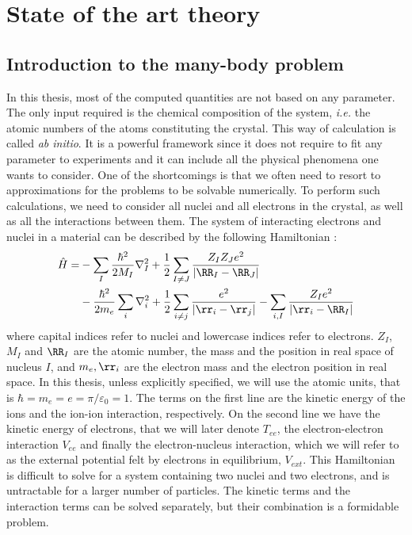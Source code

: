 \chapter{ State of the art theory} \label{chap:theory}

\chaptertoc{}
%

%
\section{Introduction to the many-body problem} \label{sec:BO_approx}
In this thesis, most of the computed quantities are not based on any parameter. The only input required is the chemical composition of the system, \textit{i.e.} the atomic numbers of the atoms constituting the crystal. This way of calculation is called \textit{ab initio}. It is a powerful framework since it does not require to fit any parameter to experiments and it can include all the physical phenomena one wants to consider. One of the shortcomings is that we often need to resort to approximations for the problems to be solvable numerically.
To perform such calculations, we need to consider all nuclei and all electrons in the crystal, as well as all the interactions between them. The system of interacting electrons and nuclei in a material can be described by the following Hamiltonian :
\begin{align}
	\hat{H} = &- \sum_I \frac{\hbar^2}{2 M_I} \nabla^2_I + \frac{1}{2} \sum_{I\neq J} \frac{Z_I Z_J e^2}{\left| \RR_I - \RR_J \right|} \nonumber \\
	&- \frac{\hbar^2}{2m_e} \sum_i \nabla^2_i + \frac{1}{2} \sum_{i\neq j} \frac{e^2}{\left| \rr_i - \rr_j \right|} - \sum_{i,I} \frac{Z_I e^2}{\left|\rr_i - \RR_I \right|}
\end{align}
where capital indices refer to nuclei and lowercase indices refer to electrons. $Z_I$, $M_I$ and $\RR_I$ are the atomic number, the mass and the position in real space of nucleus $I$, and $m_e,\rr_i$ are the electron mass and the electron position in real space. In this thesis, unless explicitly specified, we will use the atomic units, that is $\hbar = m_e = e =\pi/\varepsilon_0 =1$.
The terms on the first line are the kinetic energy of the ions and the ion-ion interaction, respectively. On the second line we have the kinetic energy of electrons, that we will later denote $T_{ee}$, the electron-electron interaction $V_{ee}$ and finally the electron-nucleus interaction, which we will refer to as the external potential felt by electrons in equilibrium, $V_{ext}$. This Hamiltonian is difficult to solve for a system containing two nuclei and two electrons, and is untractable for a larger number of particles. The kinetic terms and the interaction terms can be solved separately, but their combination is a formidable problem.

